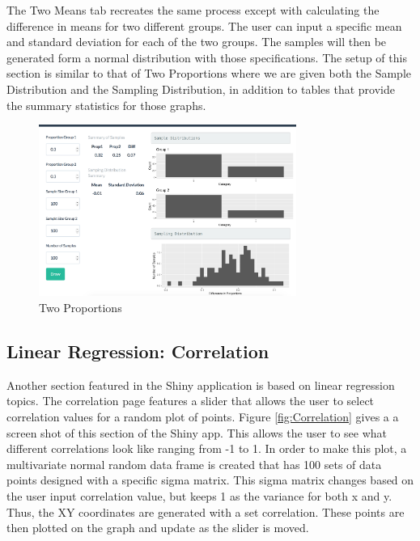 \documentclass[11pt]{book}
\begin{document}
The Two Means tab recreates the same process except with calculating the difference in means for two different groups. The user can input a specific mean and standard deviation for each of the two groups. The samples will then be generated form a normal distribution with those specifications. The setup of this section is similar to that of Two Proportions where we are given both the Sample Distribution and the Sampling Distribution, in addition to tables that provide the summary statistics for those graphs.

\begin{figure}
\centering
        \includegraphics[width=0.75\textwidth]{TwoProp.png}
        \caption{Two Proportions} 
        \label{fig:TwoProp}
\end{figure}


\newpage

\subsection{Linear Regression: Correlation}
Another section featured in the Shiny application is based on linear regression topics. The correlation page features a slider that allows the user to select correlation values for a random plot of points. Figure \ref{fig:Correlation}  gives a a screen shot of this section of the Shiny app. This allows the user to see what different correlations look like ranging from -1 to 1. In order to make this plot, a multivariate normal random data frame is created that has 100 sets of data points designed with a specific sigma matrix.  This sigma matrix changes based on the user input correlation value, but keeps 1 as the variance for both x and y.  Thus, the XY coordinates are generated with a set correlation. These points are then plotted on the graph and update as the slider is moved. 
\end{document}
